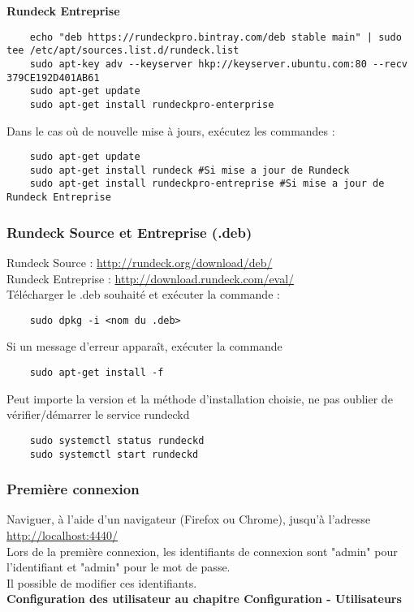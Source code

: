 \documentclass[12pt]{article}
\begin{document}
\textbf{Rundeck Entreprise}
\begin{lstlisting}
    echo "deb https://rundeckpro.bintray.com/deb stable main" | sudo tee /etc/apt/sources.list.d/rundeck.list
    sudo apt-key adv --keyserver hkp://keyserver.ubuntu.com:80 --recv 379CE192D401AB61
    sudo apt-get update
    sudo apt-get install rundeckpro-enterprise
\end{lstlisting}

Dans le cas où de nouvelle mise à jours, exécutez les commandes :
\begin{lstlisting}
    sudo apt-get update
    sudo apt-get install rundeck #Si mise a jour de Rundeck
    sudo apt-get install rundeckpro-entreprise #Si mise a jour de Rundeck Entreprise
\end{lstlisting}

\subsubsection{Rundeck Source et Entreprise (.deb)}
Rundeck Source : \url{http://rundeck.org/download/deb/}
\\
Rundeck Entreprise : \url{http://download.rundeck.com/eval/} 
\\
Télécharger le .deb souhaité et exécuter la commande : 
\begin{lstlisting}
    sudo dpkg -i <nom du .deb>
\end{lstlisting}

Si un message d'erreur apparaît, exécuter la commande 
\begin{lstlisting}
    sudo apt-get install -f
\end{lstlisting}
Peut importe la version et la méthode d'installation choisie, ne pas oublier de vérifier/démarrer le service rundeckd
\begin{lstlisting}
    sudo systemctl status rundeckd
    sudo systemctl start rundeckd
\end{lstlisting}

\subsubsection{Première connexion}
Naviguer, à l'aide d'un navigateur (Firefox ou Chrome), jusqu'à l'adresse \url{ http://localhost:4440/}
\\
Lors de la première connexion, les identifiants de connexion sont "admin" pour l'identifiant et "admin" pour le mot de passe.
\\
Il possible de modifier ces identifiants.
\vspace{0.5cm}
\\
\textbf{Configuration des utilisateur au chapitre Configuration - Utilisateurs}
\end{document}

